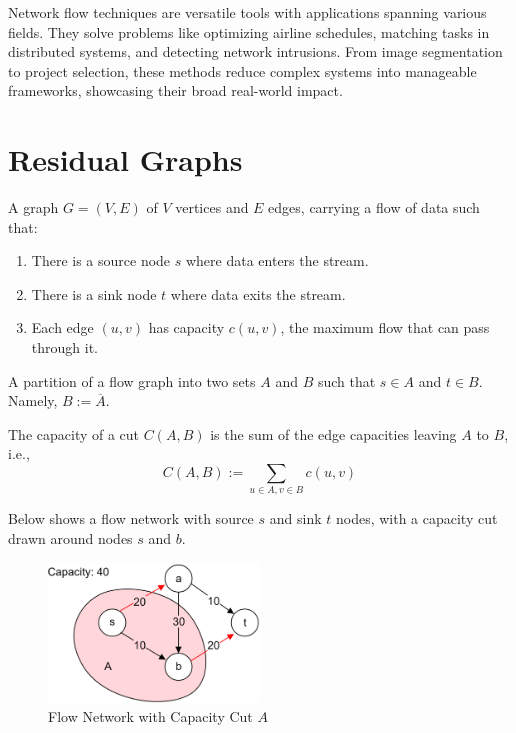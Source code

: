 
Network flow techniques are versatile tools with applications spanning various fields. They solve problems like optimizing airline schedules, matching tasks in distributed systems, and detecting network intrusions.
From image segmentation to project selection, these methods reduce complex systems into manageable frameworks, showcasing their broad real-world impact.
\section{Residual Graphs}

\begin{Def}

    A graph $G=(V,E)$ of $V$ vertices and $E$ edges, carrying a flow of data such that:
    \begin{enumerate}
        \item There is a source node $s$ where data enters the stream.
        \item There is a sink node $t$ where data exits the stream.
        \item Each edge $(u,v)$ has capacity $c(u,v)$, the maximum flow that can pass through it.
    \end{enumerate}
\end{Def}

\begin{Def}

    A partition of a flow graph into two sets $A$ and $B$ such that $s \in A$ and $t \in B$. Namely, $B:= \overline{A}$.

\end{Def}

\begin{Def}[Capacity]

    The capacity of a cut $C(A,B)$ is the sum of the edge capacities leaving $A$ to $B$, i.e.,
    \begin{equation}
        C(A,B) := \sum_{u \in A, v \in B} c(u,v)
    \end{equation}
\end{Def}

\newpage
\noindent
Below shows a flow network with source $s$ and sink $t$ nodes, with a capacity cut drawn around nodes $s$ and $b$.

\begin{figure}[h]
        \centering
        \includegraphics[width=0.5\textwidth]{Sections/net/cap.png}
        \caption{Flow Network with Capacity Cut $A$}
    \end{figure}

